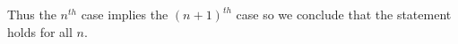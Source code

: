 \begin{myproof}
			Thus the $n^{th}$ case implies the $ (n+1)^{th}$ case so we conclude that the statement holds for all $n$.






		\end{myproof}